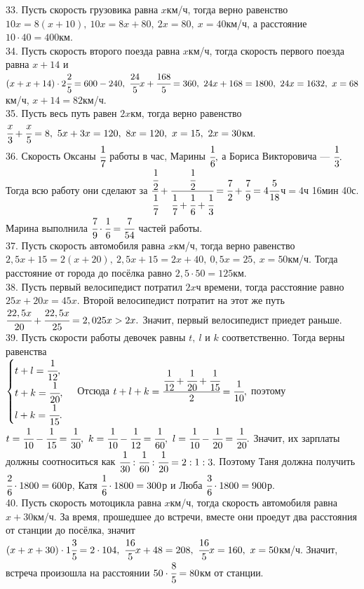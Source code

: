 33. Пусть скорость грузовика равна $x$км/ч, тогда верно равенство $10x=8(x+10),\ 10x=8x+80,\ 2x=80,\ x=40$км/ч, а расстояние $10\cdot40=400$км.\\
34. Пусть скорость второго поезда равна $x$км/ч, тогда скорость первого поезда равна $x+14$ и $(x+x+14)\cdot2\cfrac{2}{5}=600-240,\ \cfrac{24}{5}x+\cfrac{168}{5}=360,\ 24x+168=1800,\ 24x=1632,\ x=68$км/ч, $x+14=82$км/ч.\\
35. Пусть весь путь равен $2x$км, тогда верно равенство $\cfrac{x}{3}+\cfrac{x}{5}=8,\ 5x+3x=120,\ 8x=120,\ x=15,\ 2x=30$км.\\
36. Скорость Оксаны $\cfrac{1}{7}$ работы в час, Марины $\cfrac{1}{6},$ а Бориса Викторовича --- $\cfrac{1}{3}.$ Тогда всю работу они сделают за $\cfrac{\cfrac{1}{2}}{\cfrac{1}{7}}+\cfrac{\cfrac{1}{2}}{\cfrac{1}{7}+\cfrac{1}{6}+\cfrac{1}{3}}=\cfrac{7}{2}+\cfrac{7}{9}=4\cfrac{5}{18}$ч$=4$ч 16мин 40с. Марина выполнила $\cfrac{7}{9}\cdot\cfrac{1}{6}=\cfrac{7}{54}$ частей работы.\\
37. Пусть скорость автомобиля равна $x$км/ч, тогда верно равенство $2,5x+15=2(x+20),\ 2,5x+15=2x+40,\ 0,5x=25,\ x=50$км/ч. Тогда расстояние от города до посёлка равно $2,5\cdot50=125$км.\\
38. Пусть первый велосипедист потратил $2x$ч времени, тогда расстояние равно $25x+20x=45x.$ Второй велосипедист потратит на этот же путь $\cfrac{22,5x}{20}+
\cfrac{22,5x}{25}=2,025x>2x.$ Значит, первый велосипедист приедет раньше.\\
39. Пусть скорости работы девочек равны $t,\ l$ и $k$ соответственно. Тогда верны равенства\\ $\begin{cases}t+l=\cfrac{1}{12},\\ t+k=\cfrac{1}{20},\\ l+k=\cfrac{1}{15}.\end{cases}$ Отсюда $t+l+k=\cfrac{\cfrac{1}{12}+\cfrac{1}{20}+\cfrac{1}{15}}{2}=\cfrac{1}{10},$ поэтому $t=\cfrac{1}{10}-\cfrac{1}{15}=\cfrac{1}{30},\ k=\cfrac{1}{10}-\cfrac{1}{12}=\cfrac{1}{60},\ l=\cfrac{1}{10}-\cfrac{1}{20}=\cfrac{1}{20}.$ Значит, их зарплаты должны соотноситься как $\cfrac{1}{30}:\cfrac{1}{60}:\cfrac{1}{20}=2:1:3.$ Поэтому Таня должна получить $\cfrac{2}{6}\cdot1800=600$р, Катя $\cfrac{1}{6}\cdot1800=300$р и Люба $\cfrac{3}{6}\cdot1800=900$р.\\
40. Пусть скорость мотоцикла равна $x$км/ч, тогда скорость автомобиля равна $x+30$км/ч. За время, прошедшее до встречи, вместе они проедут два расстояния от станции до посёлка, значит $(x+x+30)\cdot1\cfrac{3}{5}=2\cdot104,\ \cfrac{16}{5}x+48=208,\ \cfrac{16}{5}x=160,\ x=50$км/ч. Значит, встреча произошла на расстоянии $50\cdot\cfrac{8}{5}=80$км от станции. \\
